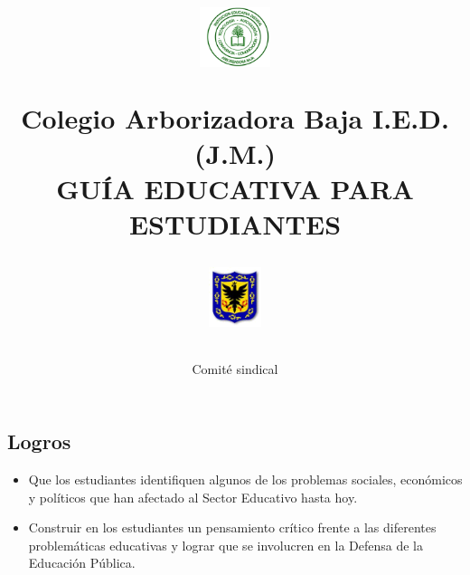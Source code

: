 \documentclass[10pt,twoside]{article}
\author{Comité sindical}
\title{\begin{minipage}{.2\textwidth}
\includegraphics[height=1.75cm]{Images/logo-colegio.png}\end{minipage}
\begin{minipage}{.55\textwidth}
\begin{center}
Colegio Arborizadora Baja I.E.D. (J.M.)\\
GUÍA EDUCATIVA PARA ESTUDIANTES\\
\end{center}
\end{minipage}\hfill
\begin{minipage}{.2\textwidth}
\includegraphics[height=1.75cm]{Images/logo-sed.png} 
\end{minipage}}
\date{}
\begin{document}
\maketitle
\subsection*{Logros}
\begin{itemize}
\item Que los estudiantes identifiquen algunos de los problemas sociales, económicos y políticos  que han afectado al Sector Educativo hasta hoy.
\item Construir en los estudiantes un pensamiento crítico frente a las diferentes problemáticas educativas y lograr que se involucren en la Defensa de la Educación Pública.
\end{itemize}
\end{document}
